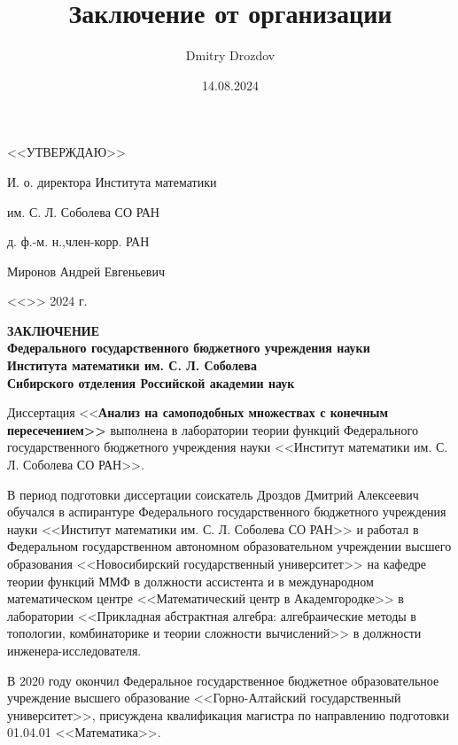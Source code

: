 \documentclass[14pt, a4paper]{extarticle}
\title{Заключение от организации}
\author{Dmitry Drozdov}
\date{14.08.2024}
\begin{document}
\noindent\hspace{7cm}<<УТВЕРЖДАЮ>>\par
\noindent\hspace{7cm}И. о. директора Института математики\par
\noindent\hspace{7cm}им. С. Л. Соболева СО РАН\par
\noindent\hspace{7cm}д. ф.-м. н.,член-корр. РАН\par
\vspace{1cm}
\noindent\hspace{7cm}Миронов Андрей Евгеньевич\par
\noindent\hspace{7cm}<<\underline{\hspace{1cm}}>>\underline{\hspace{3cm}} 2024 г.\\

\vspace{1cm}

\begin{center}\bf
ЗАКЛЮЧЕНИЕ\\
Федерального государственного бюджетного учреждения науки\\
Института математики им. С. Л. Соболева\\
Сибирского отделения Российской академии наук  
\end{center}

Диссертация {<<\bf Анализ на самоподобных множествах с конечным пересечением>>} выполнена в лаборатории теории функций Федерального государственного бюджетного учреждения науки <<Институт математики им. С. Л. Соболева СО РАН>>.

В период подготовки диссертации соискатель Дроздов Дмитрий Алексеевич обучался в аспирантуре Федерального государственного бюджетного учреждения науки <<Институт математики им. С. Л. Соболева СО РАН>> и работал в  Федеральном государственном автономном образовательном учреждении высшего образования <<Новосибирский государственный университет>> на кафедре теории функций ММФ в должности ассистента и в международном математическом центре <<Математический центр в Академгородке>> в лаборатории <<Прикладная абстрактная алгебра: алгебраические методы в топологии, комбинаторике и теории сложности вычислений>> в должности инженера-исследователя.

В 2020 году окончил Федеральное государственное бюджетное образовательное учреждение высшего образование <<Горно-Алтайский государственный университет>>, присуждена квалификация магистра по направлению подготовки 01.04.01 <<Математика>>.
\end{document}
